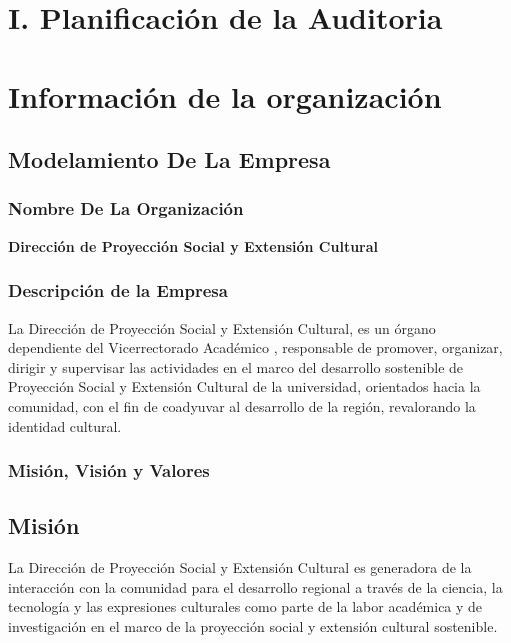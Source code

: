 \documentclass[12pt,a4paper]{article}
\begin{document}

\tableofcontents %
\pagestyle{fancy} \mystyle \newpage %
\newcommand{\dpsec}{Dirección de Proyección Social y Extensión Cultural}


\section{I. Planificación de la Auditoria}

\section{Información de la organización}
\subsection{Modelamiento De La Empresa}
\subsubsection{Nombre De La Organización}
\textbf{\dpsec}

\subsubsection{Descripción de la Empresa}
La Dirección de Proyección Social y Extensión Cultural, es un órgano dependiente del Vicerrectorado Académico \cite{mysql}, responsable de promover, organizar, dirigir y supervisar las actividades en el marco del desarrollo sostenible de Proyección Social y Extensión Cultural de la universidad, orientados hacia la comunidad, con el fin de coadyuvar al desarrollo de la región, revalorando la identidad cultural.

\subsubsection{Misión, Visión y Valores}
\subsection*{Misión}
La Dirección de Proyección Social y Extensión Cultural es generadora de la interacción con la comunidad para el desarrollo regional a través de la ciencia, la tecnología y las expresiones culturales como parte de la labor académica y de investigación en el marco de la proyección social y extensión cultural sostenible.
\end{document}
